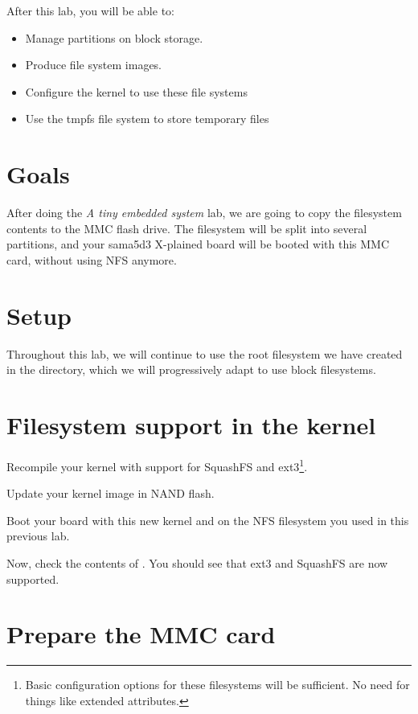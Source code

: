 
After this lab, you will be able to:
\begin{itemize}
\item Manage partitions on block storage.
\item Produce file system images.
\item Configure the kernel to use these file systems
\item Use the tmpfs file system to store temporary files
\end{itemize}

\section{Goals}

After doing the {\em A tiny embedded system} lab, we are going to copy
the filesystem contents to the MMC flash drive. The filesystem will be
split into several partitions, and your sama5d3 X-plained board will
be booted with this MMC card, without using NFS anymore.

\section{Setup}

Throughout this lab, we will continue to use the root filesystem we
have created in the 
directory, which we will progressively adapt to use block filesystems.

\section{Filesystem support in the kernel}

Recompile your kernel with support for SquashFS and ext3\footnote{Basic
configuration options for these filesystems will be sufficient. No need
for things like extended attributes.}.

Update your kernel image in NAND flash.

Boot your board with this new kernel and on the NFS filesystem you
used in this previous lab.

Now, check the contents of . You should see
 that ext3 and SquashFS are now supported.

\section{Prepare the MMC card}

